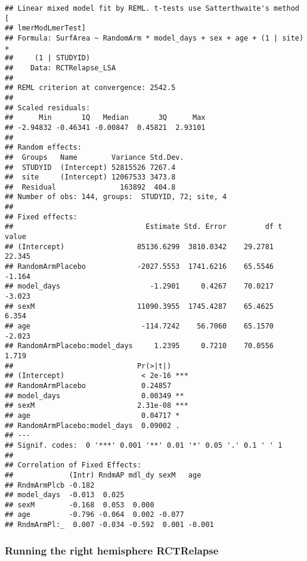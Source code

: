 \documentclass[]{article}
\theoremstyle{definition}
\theoremstyle{definition}
\theoremstyle{definition}
\theoremstyle{remark}
\begin{document}
\begin{verbatim}
## Linear mixed model fit by REML. t-tests use Satterthwaite's method [
## lmerModLmerTest]
## Formula: SurfArea ~ RandomArm * model_days + sex + age + (1 | site) +  
##     (1 | STUDYID)
##    Data: RCTRelapse_LSA
## 
## REML criterion at convergence: 2542.5
## 
## Scaled residuals: 
##      Min       1Q   Median       3Q      Max 
## -2.94832 -0.46341 -0.00847  0.45821  2.93101 
## 
## Random effects:
##  Groups   Name        Variance Std.Dev.
##  STUDYID  (Intercept) 52815526 7267.4  
##  site     (Intercept) 12067533 3473.8  
##  Residual               163892  404.8  
## Number of obs: 144, groups:  STUDYID, 72; site, 4
## 
## Fixed effects:
##                               Estimate Std. Error         df t value
## (Intercept)                 85136.6299  3810.0342    29.2781  22.345
## RandomArmPlacebo            -2027.5553  1741.6216    65.5546  -1.164
## model_days                     -1.2901     0.4267    70.0217  -3.023
## sexM                        11090.3955  1745.4287    65.4625   6.354
## age                          -114.7242    56.7060    65.1570  -2.023
## RandomArmPlacebo:model_days     1.2395     0.7210    70.0556   1.719
##                             Pr(>|t|)    
## (Intercept)                  < 2e-16 ***
## RandomArmPlacebo             0.24857    
## model_days                   0.00349 ** 
## sexM                        2.31e-08 ***
## age                          0.04717 *  
## RandomArmPlacebo:model_days  0.09002 .  
## ---
## Signif. codes:  0 '***' 0.001 '**' 0.01 '*' 0.05 '.' 0.1 ' ' 1
## 
## Correlation of Fixed Effects:
##             (Intr) RndmAP mdl_dy sexM   age   
## RndmArmPlcb -0.182                            
## model_days  -0.013  0.025                     
## sexM        -0.168  0.053  0.000              
## age         -0.796 -0.064  0.002 -0.077       
## RndmArmPl:_  0.007 -0.034 -0.592  0.001 -0.001
\end{verbatim}

\subsubsection{Running the right hemisphere
RCTRelapse}\label{running-the-right-hemisphere-rctrelapse-1}
\end{document}
